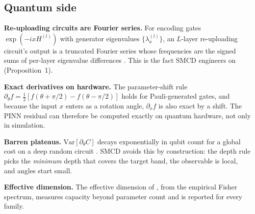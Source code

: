 \subsection{Quantum side}

\textbf{Re-uploading circuits are Fourier series.} For encoding gates $\exp(-ix H^{(l)})$
with generator eigenvalues $\{\lambda^{(l)}_a\}$, an $L$-layer re-uploading circuit's
output is a truncated Fourier series whose frequencies are the signed sums of per-layer
eigenvalue differences \citep{schuld2021effect}. This is the fact SMCD engineers on
(Proposition~1).

\textbf{Exact derivatives on hardware.} The parameter-shift rule
$\partial_\theta f = \tfrac12[f(\theta+\pi/2) - f(\theta-\pi/2)]$ holds for Pauli-generated
gates, and because the input $x$ enters as a rotation angle, $\partial_x f$ is also exact
by a shift. The PINN residual can therefore be computed exactly on quantum hardware, not
only in simulation.

\textbf{Barren plateaus.} $\mathrm{Var}[\partial_\theta C]$ decays exponentially in qubit
count for a global cost on a deep random circuit \citep{mcclean2018barren}. SMCD avoids
this by construction: the depth rule picks the \emph{minimum} depth that covers the target
band, the observable is local, and angles start small.

\textbf{Effective dimension.} The effective dimension of \citet{abbas2021effdim}, from the
empirical Fisher spectrum, measures capacity beyond parameter count and is reported for
every family.
